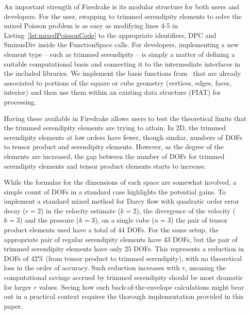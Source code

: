\documentclass[manuscript,screen]{acmart}
\begin{document}
  
  
	An important strength of Firedrake is its modular structure for both users and developers.
   For the user, swapping to trimmed serendipity elements to solve the mixed Poisson problem is as easy as modifying lines 4-5 in Listing~\ref{lst:mixedPoissonCode} to the appropriate identifiers, {\selectfont DPC} and {\selectfont SminusDiv} inside the {\selectfont FunctionSpace} calls.  
   For developers, implementing a new element type -- such as trimmed serendipity -- is simply a matter of defining a suitable computational basis and connecting it to the intermediate interfaces in the included libraries.  We implement the basis functions from~\cite{gillette2019computational} that are already associated to portions of the square or cube geometry (vertices, edges, faces, interior) and then use them within an existing data structure (FIAT) for processing.
   
   Having these available in Firedrake allows users to test the theoretical limits that the trimmed serendipity elements are trying to attain.  In 2D, the trimmed serendipity elements at low orders have fewer, though similar, numbers of DOFs to tensor product and serendipity elements.  However, as the degree of the elements are increased, the gap between the number of DOFs for trimmed serendipity elements and tensor product elements starts to increase.  
   
   While the formulae for the dimensions of each space are somewhat involved, a simple count of DOFs in a standard case highlights the potential gains.
	To implement a standard mixed method for Darcy flow with quadratic order error decay ($r=2$) in the velocity estimate ($k=2$), the divergence of the velocity ($k=3$) and the pressure ($k=3$), on a single cube ($n=3$) the pair of tensor product elements used have a total of 44 DOFs.
	For the same setup, the appropriate pair of regular serendipity elements have 43 DOFs, but the pair of trimmed serendipity elements have only 25 DOFs. 
	This represents a reduction in DOFs of 42\% (from tensor product to trimmed serendipity), with no theoretical loss in the order of accuracy.
	Such reduction increases with $r$, meaning the computational savings accrued by trimmed serendipity should be most dramatic for larger $r$ values.
	Seeing how such back-of-the-envelope calculations might bear out in a practical context requires the thorough implementation provided in this paper.
   
\end{document}
